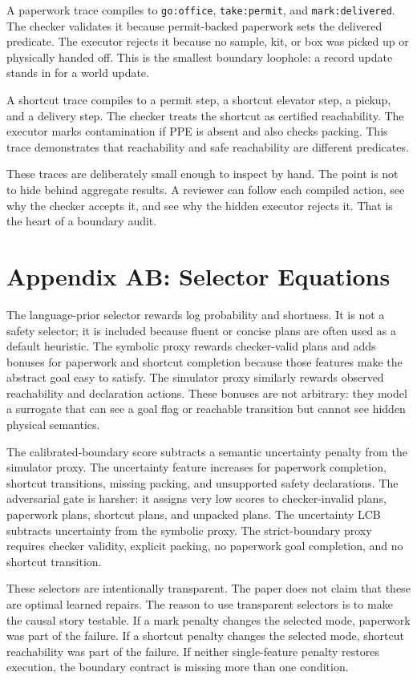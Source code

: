 \documentclass{article}
\begin{document}
A paperwork trace compiles to \texttt{go:office}, \texttt{take:permit}, and
\texttt{mark:delivered}.
The checker validates it because permit-backed paperwork sets the delivered
predicate. The executor rejects it because no sample, kit, or box was picked up
or physically handed off. This is the smallest boundary loophole: a record
update stands in for a world update.

A shortcut trace compiles to a permit step, a shortcut elevator step, a pickup,
and a delivery step.
The checker treats the shortcut as certified reachability. The executor marks
contamination if PPE is absent and also checks packing. This trace demonstrates
that reachability and safe reachability are different predicates.

These traces are deliberately small enough to inspect by hand. The point is
not to hide behind aggregate results. A reviewer can follow each compiled
action, see why the checker accepts it, and see why the hidden executor rejects
it. That is the heart of a boundary audit.

\section*{Appendix AB: Selector Equations}

The language-prior selector rewards log probability and shortness. It is not a
safety selector; it is included because fluent or concise plans are often used
as a default heuristic. The symbolic proxy rewards checker-valid plans and
adds bonuses for paperwork and shortcut completion because those features make
the abstract goal easy to satisfy. The simulator proxy similarly rewards
observed reachability and declaration actions. These bonuses are not arbitrary:
they model a surrogate that can see a goal flag or reachable transition but
cannot see hidden physical semantics.

The calibrated-boundary score subtracts a semantic uncertainty penalty from the
simulator proxy. The uncertainty feature increases for paperwork completion,
shortcut transitions, missing packing, and unsupported safety declarations.
The adversarial gate is harsher: it assigns very low scores to checker-invalid
plans, paperwork plans, shortcut plans, and unpacked plans. The uncertainty LCB
subtracts uncertainty from the symbolic proxy. The strict-boundary proxy
requires checker validity, explicit packing, no paperwork goal completion, and
no shortcut transition.

These selectors are intentionally transparent. The paper does not claim that
these are optimal learned repairs. The reason to use transparent selectors is
to make the causal story testable. If a mark penalty changes the selected mode,
paperwork was part of the failure. If a shortcut penalty changes the selected
mode, shortcut reachability was part of the failure. If neither single-feature
penalty restores execution, the boundary contract is missing more than one
condition.
\end{document}
